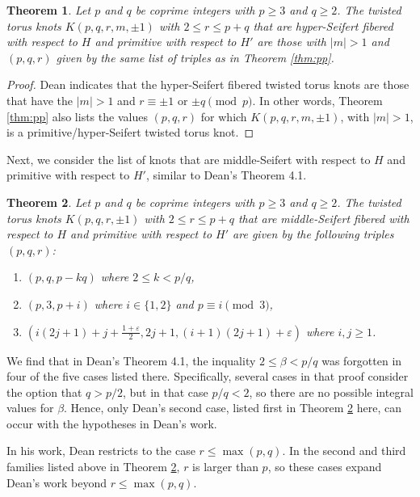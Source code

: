 \documentclass{amsart}
\newtheorem{theorem}{Theorem}
\newcommand{\eps}{\varepsilon}
\begin{document}
\begin{theorem}\label{thm:phS}
Let $p$ and $q$ be coprime integers with $p\ge 3$ and $q \ge 2$. The twisted torus knots $K(p,q,r, m, \pm 1)$ with $2 \le r \le p+q$ that are hyper-Seifert fibered with respect to $H$ and primitive with respect to $H'$ are those with $|m|>1$ and $(p,q,r)$ given by the same list of triples as in Theorem \ref{thm:pp}.
\end{theorem}

\begin{proof}
Dean \cite{DeanSFSSurgeries} indicates that the hyper-Seifert fibered twisted torus knots are those that have the $|m|>1$ and $r \equiv \pm 1$ or $\pm q \pmod p$. In other words, Theorem \ref{thm:pp} also lists the values $(p,q,r)$ for which $K(p,q, r, m, \pm1)$, with $|m|>1$, is a primitive/hyper-Seifert twisted torus knot.
\end{proof}

Next, we consider the list of knots that are middle-Seifert with respect to $H$ and primitive with respect to $H'$, similar to Dean's Theorem 4.1. 

\vspace{.1in}

\begin{theorem}\label{thm:pS}
Let $p$ and $q$ be coprime integers with $p\ge 3$ and $q \ge 2$. The twisted torus knots $K(p,q,r, \pm 1)$ with $2 \le r \le p+q$ that are middle-Seifert fibered with respect to $H$ and primitive with respect to $H'$ are given by the following triples $(p,q,r)$:
\begin{enumerate}
\item $(p,q, p-k q)$ where $2 \le k < p/q$,
\item $(p, 3, p+i)$ where $i \in \{1,2\}$ and $p \equiv i \pmod 3$,
\item $(i(2j + 1) + j + \frac{1+\eps}{2}, 2j+1, (i+1)(2j + 1) + \eps)$ where $i, j \ge 1$.
\end{enumerate}
\end{theorem}

We find that in Dean's Theorem 4.1, the inquality $2 \le \beta < p/q$ was forgotten in four of the five cases listed there. Specifically, several cases in that proof consider the option that $q > p/2$, but in that case $p/q <2$, so there are no possible integral values for $\beta$. Hence, only Dean's second case, listed first in Theorem \ref{thm:pS} here, can occur with the hypotheses in Dean's work. 

In his work, Dean restricts to the case  $r \le \max(p,q)$. In the second and third families listed above in Theorem \ref{thm:pS}, $r$ is larger than $p$, so these cases expand Dean's work beyond $r \le \max(p,q)$. 
\end{document}
